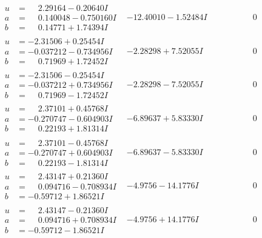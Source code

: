 \documentclass[1p]{elsarticle_modified}
\theoremstyle{definition}
\begin{document}
$$\begin{array}{c|c|c}
\begin{aligned}
u &= \phantom{-}2.29164 - 0.20640 I \\
a &= \phantom{-}0.140048 - 0.750160 I \\
b &= \phantom{-}0.14771 + 1.74394 I\end{aligned}
 & -12.40010 - 1.52484 I & \phantom{-0.000000 } 0 \\ \hline\begin{aligned}
u &= -2.31506 + 0.25454 I \\
a &= -0.037212 - 0.734956 I \\
b &= \phantom{-}0.71969 + 1.72452 I\end{aligned}
 & -2.28298 + 7.52055 I & \phantom{-0.000000 } 0 \\ \hline\begin{aligned}
u &= -2.31506 - 0.25454 I \\
a &= -0.037212 + 0.734956 I \\
b &= \phantom{-}0.71969 - 1.72452 I\end{aligned}
 & -2.28298 - 7.52055 I & \phantom{-0.000000 } 0 \\ \hline\begin{aligned}
u &= \phantom{-}2.37101 + 0.45768 I \\
a &= -0.270747 - 0.604903 I \\
b &= \phantom{-}0.22193 + 1.81314 I\end{aligned}
 & -6.89637 + 5.83330 I & \phantom{-0.000000 } 0 \\ \hline\begin{aligned}
u &= \phantom{-}2.37101 - 0.45768 I \\
a &= -0.270747 + 0.604903 I \\
b &= \phantom{-}0.22193 - 1.81314 I\end{aligned}
 & -6.89637 - 5.83330 I & \phantom{-0.000000 } 0 \\ \hline\begin{aligned}
u &= \phantom{-}2.43147 + 0.21360 I \\
a &= \phantom{-}0.094716 - 0.708934 I \\
b &= -0.59712 + 1.86521 I\end{aligned}
 & -4.9756 - 14.1776 I & \phantom{-0.000000 } 0 \\ \hline\begin{aligned}
u &= \phantom{-}2.43147 - 0.21360 I \\
a &= \phantom{-}0.094716 + 0.708934 I \\
b &= -0.59712 - 1.86521 I\end{aligned}
 & -4.9756 + 14.1776 I & \phantom{-0.000000 } 0\\

\end{array}$$
\end{document}
